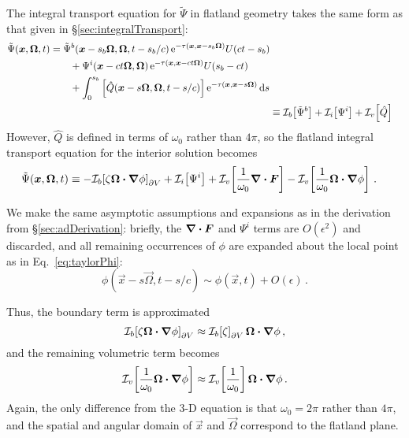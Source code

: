 The integral transport equation for $\tilde\Psi$ in flatland geometry takes the
same form as that given in \S\ref{sec:integralTransport}:
\begin{align*}
\begin{split}
  \tilde\Psi(\bm{x}, \bm{\Omega}, t)
  &=
  \tilde\Psi^b(\bm{x} - s_b\bm{\Omega}, \bm{\Omega}, t - s_b/c)
  \mathop{}\!\mathrm{e}^{ -\tau(\bm{x}, \bm{x} - s_b \bm{\Omega})}
  U(ct - s_b)
  \\
  &\qquad + \Psi^i( \bm{x} - ct \bm{\Omega}, \bm{\Omega})
  \mathop{}\!\mathrm{e}^{ -\tau(\bm{x}, \bm{x} - ct \bm{\Omega})}
  U( s_b - ct)
  \\
  &\qquad + \int_{0}^{s_b}
  \left[ \hat Q(\bm{x} - s \bm{\Omega}, \bm{\Omega}, t-s/c)
  \right]
  \mathop{}\!\mathrm{e}^{ -\tau(\bm{x}, \bm{x} - s \bm{\Omega})}
  \mathop{}\!\mathrm{d} s
\end{split}
  \\
    &\equiv \mathcal{I}_{b}\!\left[\tilde\Psi^b\right]
    + \mathcal{I}_{i}\!\left[\Psi^i\right]
    + \mathcal{I}_{v}\!\left[\hat Q\right]
\end{align*}
However, $\hat Q$ is defined in terms of $\omega_0$ rather than $4\pi$, so the
flatland integral transport equation for the interior solution becomes
\begin{align} \label{eq:flatinverseTransportBrief}
    \tilde\Psi(\bm{x}, \bm{\Omega}, t)
    &\equiv
    -\mathcal{I}_{b}\!\left[\zeta \bm{\Omega}\bm{\cdot} \bm{\nabla} \phi\right]_{\partial V}
    + \mathcal{I}_{i}\!\left[\Psi^i\right]
    + \mathcal{I}_{v}\!\left[\frac{1}{\omega_0} \bm{\nabla} \bm{\cdot}\bm{F} \right]
    - \mathcal{I}_{v}\!\left[\frac{1}{\omega_0} \bm{\Omega}\bm{\cdot} \bm{\nabla} \phi\right]
    \,.
\end{align}

We make the same asymptotic assumptions and expansions as in the derivation from
\S\ref{sec:adDerivation}: briefly, the $\bm{\nabla} \bm{\cdot}\bm{F}$ and $\Psi^i$ terms are
$O(\epsilon^2)$ and discarded, and all remaining occurrences of $\phi$ are
expanded about the local point as in Eq.~\eqref{eq:taylorPhi}:
\begin{equation*}
  \phi(\vec{x} - s \vec{\Omega}, t-s/c)
  \sim \phi(\vec{x},t) + O(\epsilon) \,.
\end{equation*}

Thus, the boundary term is approximated 
\begin{equation*}
  \mathcal{I}_{b}\!\left[\zeta \bm{\Omega}\bm{\cdot} \bm{\nabla} \phi\right]_{\partial V}
  \approx \mathcal{I}_{b}\!\left[\zeta\right]_{\partial V}  \bm{\Omega}\bm{\cdot} \bm{\nabla} \phi \,,
\end{equation*}
and the remaining volumetric term becomes
\begin{equation*}
  \mathcal{I}_{v}\!\left[\frac{1}{\omega_0} \bm{\Omega}\bm{\cdot} \bm{\nabla} \phi\right]
  \approx \mathcal{I}_{v}\!\left[\frac{1}{\omega_0}\right] \bm{\Omega}\bm{\cdot} \bm{\nabla} \phi \,.
\end{equation*}
Again, the only difference from the 3-D equation is that $\omega_0=2\pi$ rather
than $4\pi$, and the spatial and angular domain of $\vec{x}$ and $\vec{\Omega}$
correspond to the flatland plane.

